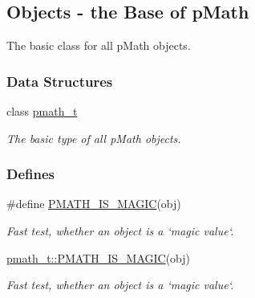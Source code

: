 \hypertarget{group__objects}{
\subsection{Objects - the Base of pMath}
\label{group__objects}
}
The basic class for all pMath objects.  


\subsubsection*{Data Structures}
\begin{CompactItemize}
\item 
class \hyperlink{classpmath__t}{pmath\_\-t}
\begin{CompactList}\small\item\em The basic type of all pMath objects. \item\end{CompactList}\end{CompactItemize}
\subsubsection*{Defines}
\begin{CompactItemize}
\item 
\#define \hyperlink{group__objects_g6251ebcdaf2f71e5db906a65a8efa621}{PMATH\_\-IS\_\-MAGIC}(obj)
\begin{CompactList}\small\item\em Fast test, whether an object is a `magic value`. \item\end{CompactList}\item 
\hyperlink{group__objects_gfa4048bca71f5022d1fb979a5b930a11}{pmath\_\-t::PMATH\_\-IS\_\-MAGIC}(obj)
\begin{CompactList}\small\item\em Fast test, whether an object is a `magic value`. \item\end{CompactList}\end{CompactItemize}
